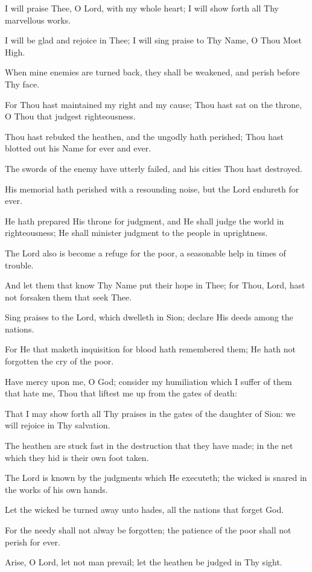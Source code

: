 I will praise Thee, O Lord, with my whole heart; I will show forth all Thy marvellous works.

I will be glad and rejoice in Thee; I will sing praise to Thy Name, O Thou Most High.

When mine enemies are turned back, they shall be weakened, and perish before Thy face.

For Thou hast maintained my right and my cause; Thou hast sat on the throne, O Thou that judgest righteousness.

Thou hast rebuked the heathen, and the ungodly hath perished; Thou hast blotted out his Name for ever and ever.

The swords of the enemy have utterly failed, and his cities Thou hast destroyed.

His memorial hath perished with a resounding noise, but the Lord endureth for ever.

He hath prepared His throne for judgment, and He shall judge the world in righteousness; He shall minister judgment to the people in uprightness.

The Lord also is become a refuge for the poor, a seasonable help in times of trouble.

And let them that know Thy Name put their hope in Thee; for Thou, Lord, hast not forsaken them that seek Thee.

Sing praises to the Lord, which dwelleth in Sion; declare His deeds among the nations.

For He that maketh inquisition for blood hath remembered them; He hath not forgotten the cry of the poor.

Have mercy upon me, O God; consider my humiliation which I suffer of them that hate me, Thou that liftest me up from the gates of death:

That I may show forth all Thy praises in the gates of the daughter of Sion: we will rejoice in Thy salvation.

The heathen are stuck fast in the destruction that they have made; in the net which they hid is their own foot taken.

The Lord is known by the judgments which He executeth; the wicked is snared in the works of his own hands.

Let the wicked be turned away unto hades, all the nations that forget God.

For the needy shall not alway be forgotten; the patience of the poor shall not perish for ever.

Arise, O Lord, let not man prevail; let the heathen be judged in Thy sight.

